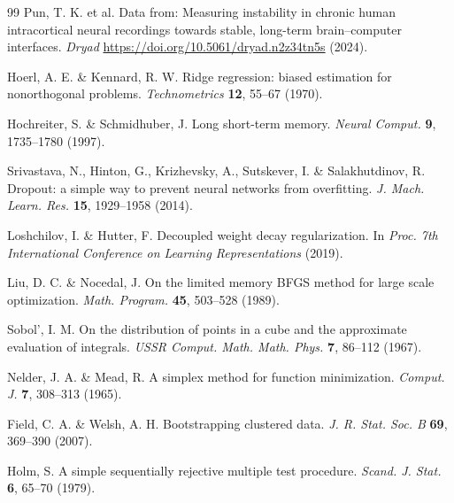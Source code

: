 \begin{thebibliography}{99}
 Pun, T. K. et al. Data from: Measuring instability in chronic human intracortical neural recordings towards stable, long-term brain--computer interfaces. \textit{Dryad} \url{https://doi.org/10.5061/dryad.n2z34tn5s} (2024).

 Hoerl, A. E. \& Kennard, R. W. Ridge regression: biased estimation for nonorthogonal problems. \textit{Technometrics} \textbf{12}, 55--67 (1970).

 Hochreiter, S. \& Schmidhuber, J. Long short-term memory. \textit{Neural Comput.} \textbf{9}, 1735--1780 (1997).

 Srivastava, N., Hinton, G., Krizhevsky, A., Sutskever, I. \& Salakhutdinov, R. Dropout: a simple way to prevent neural networks from overfitting. \textit{J. Mach. Learn. Res.} \textbf{15}, 1929--1958 (2014).

 Loshchilov, I. \& Hutter, F. Decoupled weight decay regularization. In \textit{Proc. 7th International Conference on Learning Representations} (2019).

 Liu, D. C. \& Nocedal, J. On the limited memory BFGS method for large scale optimization. \textit{Math. Program.} \textbf{45}, 503--528 (1989).

 Sobol', I. M. On the distribution of points in a cube and the approximate evaluation of integrals. \textit{USSR Comput. Math. Math. Phys.} \textbf{7}, 86--112 (1967).

 Nelder, J. A. \& Mead, R. A simplex method for function minimization. \textit{Comput. J.} \textbf{7}, 308--313 (1965).

 Field, C. A. \& Welsh, A. H. Bootstrapping clustered data. \textit{J. R. Stat. Soc. B} \textbf{69}, 369--390 (2007).

 Holm, S. A simple sequentially rejective multiple test procedure. \textit{Scand. J. Stat.} \textbf{6}, 65--70 (1979).

\end{thebibliography}
